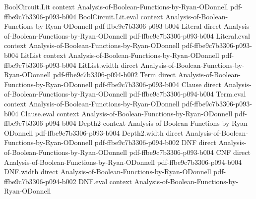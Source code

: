 \begin{theorem}
\leanok
{}
\proofstep
  {BoolCircuit.Lit}
  {context}
  {Analysis-of-Boolean-Functions-by-Ryan-ODonnell}
  {pdf-ffbe9c7b3306-p093-b004}
\proofstep
  {BoolCircuit.Lit.eval}
  {context}
  {Analysis-of-Boolean-Functions-by-Ryan-ODonnell}
  {pdf-ffbe9c7b3306-p093-b004}
\proofstep
  {Literal}
  {direct}
  {Analysis-of-Boolean-Functions-by-Ryan-ODonnell}
  {pdf-ffbe9c7b3306-p093-b004}
\proofstep
  {Literal.eval}
  {context}
  {Analysis-of-Boolean-Functions-by-Ryan-ODonnell}
  {pdf-ffbe9c7b3306-p093-b004}
\proofstep
  {LitList}
  {context}
  {Analysis-of-Boolean-Functions-by-Ryan-ODonnell}
  {pdf-ffbe9c7b3306-p093-b004}
\proofstep
  {LitList.width}
  {direct}
  {Analysis-of-Boolean-Functions-by-Ryan-ODonnell}
  {pdf-ffbe9c7b3306-p094-b002}
\proofstep
  {Term}
  {direct}
  {Analysis-of-Boolean-Functions-by-Ryan-ODonnell}
  {pdf-ffbe9c7b3306-p093-b004}
\proofstep
  {Clause}
  {direct}
  {Analysis-of-Boolean-Functions-by-Ryan-ODonnell}
  {pdf-ffbe9c7b3306-p094-b004}
\proofstep
  {Term.eval}
  {context}
  {Analysis-of-Boolean-Functions-by-Ryan-ODonnell}
  {pdf-ffbe9c7b3306-p093-b004}
\proofstep
  {Clause.eval}
  {context}
  {Analysis-of-Boolean-Functions-by-Ryan-ODonnell}
  {pdf-ffbe9c7b3306-p094-b004}
\proofstep
  {Depth2}
  {context}
  {Analysis-of-Boolean-Functions-by-Ryan-ODonnell}
  {pdf-ffbe9c7b3306-p093-b004}
\proofstep
  {Depth2.width}
  {direct}
  {Analysis-of-Boolean-Functions-by-Ryan-ODonnell}
  {pdf-ffbe9c7b3306-p094-b002}
\proofstep
  {DNF}
  {direct}
  {Analysis-of-Boolean-Functions-by-Ryan-ODonnell}
  {pdf-ffbe9c7b3306-p093-b004}
\proofstep
  {CNF}
  {direct}
  {Analysis-of-Boolean-Functions-by-Ryan-ODonnell}
  {pdf-ffbe9c7b3306-p094-b004}
\proofstep
  {DNF.width}
  {direct}
  {Analysis-of-Boolean-Functions-by-Ryan-ODonnell}
  {pdf-ffbe9c7b3306-p094-b002}
\proofstep
  {DNF.eval}
  {context}
  {Analysis-of-Boolean-Functions-by-Ryan-ODonnell}

\end{theorem}

